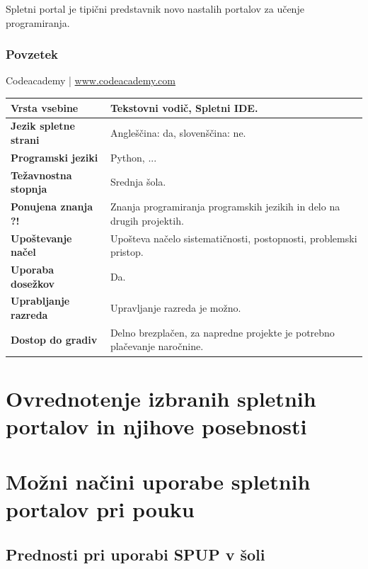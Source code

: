 Spletni portal je tipični predstavnik novo nastalih portalov za učenje
programiranja.

\subsubsection{Povzetek}

\begin{osebnabox}[label={osebna:codeacademy}]{Codeacademy | \url{www.codeacademy.com}}
    \begin{tabular}{
  p{} |
  p{}  }
  \textbf{Vrsta vsebine} & Tekstovni vodič, Spletni IDE. \\
      \hline
  \textbf{Jezik spletne strani} &  Angleščina: da, slovenščina: ne. \\
      \hline
  \textbf{Programski jeziki} & Python, ... \\
      \hline
  \textbf{Težavnostna stopnja} & Srednja šola. \\
      \hline
  \textbf{Ponujena znanja ?!} & Znanja programiranja programskih jezikih
      in delo na drugih projektih. \\
      \hline
  \textbf{Upoštevanje načel} & Upošteva načelo sistematičnosti,
      postopnosti, problemski pristop. \\
      \hline
  \textbf{Uporaba dosežkov} & Da. \\
      \hline
  \textbf{Uprabljanje razreda} & Upravljanje razreda je možno. \\
      \hline
  \textbf{Dostop do gradiv} & Delno brezplačen, za napredne projekte je
      potrebno plačevanje naročnine. \\
\end{tabular}
\end{osebnabox}

\section{Ovrednotenje izbranih spletnih portalov in njihove posebnosti}
\label{sec:pregled_spletnih_portalov}


\section{Možni načini uporabe spletnih portalov pri pouku}
\label{sec:načini_uporabe_sp}

\subsection{Prednosti pri uporabi SPUP v šoli }
\label{sec:Prednosti_pri_uporavi_SPUP}

